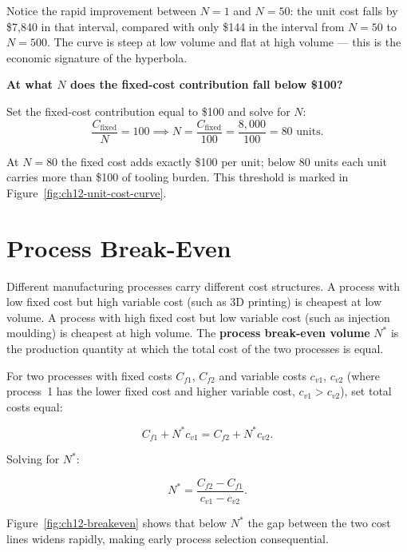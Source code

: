 \noindent Notice the rapid improvement between $N = 1$ and $N = 50$: the unit
cost falls by \$7,840 in that interval, compared with only \$144 in the
interval from $N = 50$ to $N = 500$.
The curve is steep at low volume and flat at high volume --- this is the
economic signature of the hyperbola.

\medskip
\noindent\textbf{At what $N$ does the fixed-cost contribution fall below
\$100?}

Set the fixed-cost contribution equal to \$100 and solve for $N$:
\[
  \frac{C_{\text{fixed}}}{N} = 100
  \implies N = \frac{C_{\text{fixed}}}{100} = \frac{8{,}000}{100} = 80
  \text{ units.}
\]

At $N = 80$ the fixed cost adds exactly \$100 per unit; below 80 units each
unit carries more than \$100 of tooling burden.
This threshold is marked in Figure~\ref{fig:ch12-unit-cost-curve}.

\section{Process Break-Even}
\label{sec:ch12-breakeven}

Different manufacturing processes carry different cost structures.
A process with low fixed cost but high variable cost (such as 3D printing)
is cheapest at low volume.
A process with high fixed cost but low variable cost (such as injection
moulding) is cheapest at high volume.
The \textbf{process break-even volume} $N^{*}$ is
the production quantity at which the total cost of the two processes is equal.

For two processes with fixed costs $C_{f1}$, $C_{f2}$ and variable costs
$c_{v1}$, $c_{v2}$ (where process~1 has the lower fixed cost and higher
variable cost, $c_{v1} > c_{v2}$), set total costs equal:

\[
  C_{f1} + N^{*} c_{v1} = C_{f2} + N^{*} c_{v2}.
\]

Solving for $N^{*}$:

\begin{equation}
  N^{*} = \frac{C_{f2} - C_{f1}}{c_{v1} - c_{v2}}.
  \label{eq:ch12-breakeven}
\end{equation}

Figure~\ref{fig:ch12-breakeven} shows that below $N^{*}$ the gap between the two cost lines widens rapidly, making early process selection consequential.

